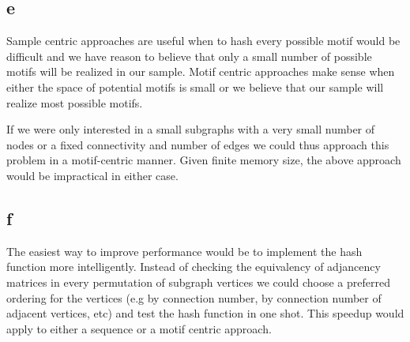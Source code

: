 \documentclass[12pt,draft,a4paper]{article}
\begin{document}
\subsection*{e}
Sample centric approaches are useful when to hash every possible motif would be difficult and we have reason to believe that only a small number of possible motifs will be realized in our sample. Motif centric approaches make sense when either the space of potential motifs is small or we believe that our sample will realize most possible motifs. 

If we were only interested in a small subgraphs with a very small number of nodes or a fixed connectivity and number of edges we could thus approach this problem in a motif-centric manner. Given finite memory size, the above approach would be impractical in either case.

\subsection*{f}
The easiest way to improve performance would be to implement the hash function more intelligently. Instead of checking the equivalency of adjancency matrices in every permutation of subgraph vertices we could choose a preferred ordering for the vertices (e.g by connection number, by connection number of adjacent vertices, etc) and test the hash function in one shot. This speedup would apply to either a sequence or a motif centric approach.
\end{document}
